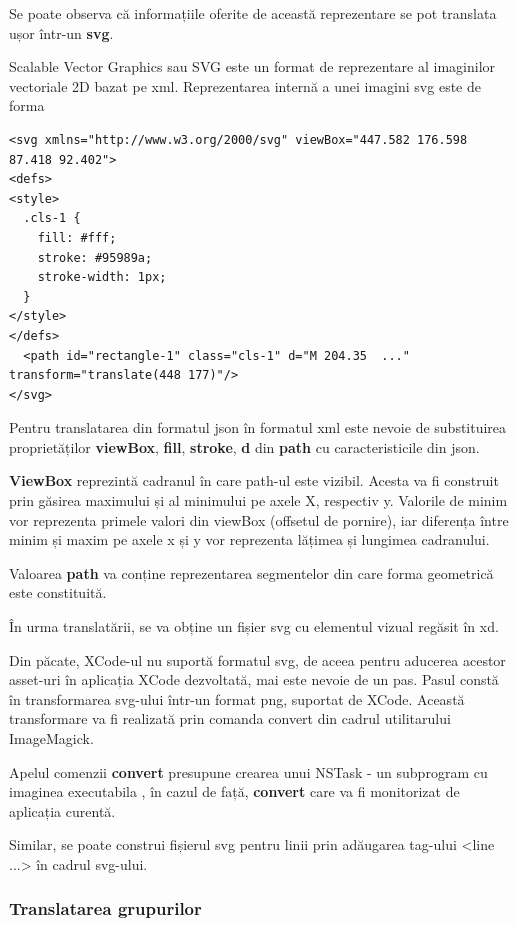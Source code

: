 Se poate observa că informațiile oferite de această reprezentare se pot translata ușor într-un \textbf{svg}. 

Scalable Vector Graphics sau SVG este un format de reprezentare al imaginilor vectoriale 2D bazat pe xml. Reprezentarea internă a unei imagini svg este de forma 
\lstset{language=XML}
\begin{lstlisting}
<svg xmlns="http://www.w3.org/2000/svg" viewBox="447.582 176.598 87.418 92.402">
<defs>
<style>
  .cls-1 {
    fill: #fff;
    stroke: #95989a;
    stroke-width: 1px;
  }
</style>
</defs>
  <path id="rectangle-1" class="cls-1" d="M 204.35  ..." transform="translate(448 177)"/>
</svg>
\end{lstlisting}

Pentru translatarea din formatul json în formatul xml este nevoie de substituirea proprietăților \textbf{viewBox}, \textbf{fill}, \textbf{stroke}, \textbf{d} din \textbf{path} cu caracteristicile din json. 

\textbf{ViewBox} reprezintă cadranul în care path-ul este vizibil. Acesta va fi construit prin găsirea maximului și al minimului pe axele X, respectiv y. Valorile de minim vor reprezenta primele valori din viewBox (offsetul de pornire), iar diferența între minim și maxim pe axele x și y vor reprezenta lățimea și lungimea cadranului.

Valoarea \textbf{path} va conține reprezentarea segmentelor din care forma geometrică este constituită.

În urma translatării, se va obține un fișier svg cu elementul vizual regăsit în xd. 

Din păcate, XCode-ul nu suportă formatul svg, de aceea pentru aducerea acestor asset-uri în aplicația XCode dezvoltată, mai este nevoie de un pas. Pasul constă în transformarea svg-ului într-un format png, suportat de XCode. Această transformare va fi realizată prin comanda convert din cadrul utilitarului ImageMagick. 

Apelul comenzii \textbf{convert} presupune crearea unui NSTask - un subprogram cu imaginea executabila , în cazul de față, \textbf{convert}  care va fi monitorizat de aplicația curentă. 

Similar, se poate construi fișierul svg pentru linii prin adăugarea tag-ului <line ...> în cadrul svg-ului.

\subsubsection{Translatarea grupurilor}

